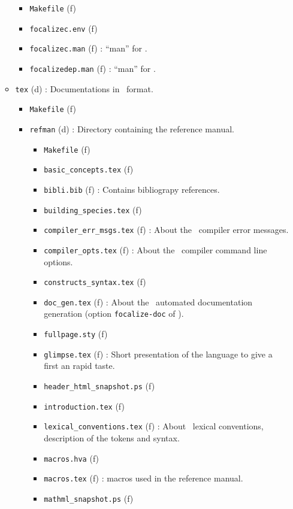 \begin{itemize}
\begin{itemize}
    \begin{itemize}
    \item {\tt Makefile} (f)
    \item {\tt focalizec.env} (f)
    \item {\tt focalizec.man} (f) : ``man'' for \focalizec.
    \item {\tt focalizedep.man} (f) : ``man'' for \focalizedep.
    \end{itemize}
  \item {\tt  tex} (d) : Documentations in \latex\ format.
    \begin{itemize}
    \item {\tt Makefile} (f)
    \item {\tt refman} (d) : Directory containing the reference manual.
      \begin{itemize}
      \item {\tt Makefile} (f)
      \item {\tt basic\_concepts.tex} (f)
      \item {\tt bibli.bib} (f) : Contains bibliograpy references.
      \item {\tt building\_species.tex} (f)
      \item {\tt compiler\_err\_msgs.tex} (f) : About the \focalizec\
        compiler error messages.
      \item {\tt compiler\_opts.tex} (f) : About the \focalizec\
        compiler command line options.
      \item {\tt constructs\_syntax.tex} (f)
      \item {\tt doc\_gen.tex} (f) : About the \focalize\ automated
        documentation generation (option {\tt focalize-doc} of
        \focalizec).
      \item {\tt fullpage.sty} (f)
      \item {\tt glimpse.tex} (f) : Short presentation of the language
        to give a first an rapid taste.
      \item {\tt header\_html\_snapshot.ps} (f)
      \item {\tt introduction.tex} (f)
      \item {\tt lexical\_conventions.tex} (f) : About \focalize\ lexical
        conventions, description of the tokens and syntax.
      \item {\tt macros.hva} (f)
      \item {\tt macros.tex} (f) : \latex macros used in the reference
        manual.
      \item {\tt mathml\_snapshot.ps} (f)

\end{itemize}
\end{itemize}
\end{itemize}
\end{itemize}
